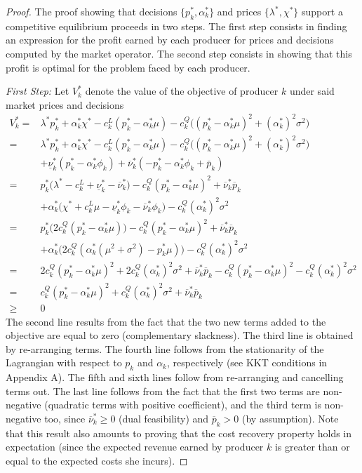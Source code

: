 \documentclass{article}
\begin{document}
\begin{proof}
The proof showing that decisions $\{p_k^*, \alpha_k^*\}$ and prices $\{\lambda^*, \chi^*\}$ support a competitive equilibrium proceeds in two steps. The first step consists in finding an expression for the profit earned by each producer for prices and decisions computed by the market operator. The second step consists in showing that this profit is optimal for the problem faced by each producer.

\textit{First Step:} Let $V_k^*$ denote the value of the objective of producer $k$ under said market prices and decisions
\begin{align*}
    V_k^* =& \lambda^*p_k^* + \alpha_k^*\chi^* - c_k^L(p_k^* - \alpha_k^* \mu) - c_k^Q\big((p_k^* - \alpha_k^* \mu)^2 + (\alpha_k^*)^2\sigma^2\big) \\
    =& \lambda^*p_k^* + \alpha_k^*\chi^* - c_k^L(p_k^* - \alpha_k^* \mu) - c_k^Q\big((p_k^* - \alpha_k^* \mu)^2 + (\alpha_k^*)^2\sigma^2\big)\\
    & + \underline{\nu}_k^* (p_k^* - \alpha_k^* \phi_k) + \overline{\nu}_k^*(-p_k^* - \alpha_k^* \phi_k + \bar{p}_k)\\
    =& p_k^*\big(\lambda^* - c_k^L + \underline{\nu}_k^* - \overline{\nu}_k^*\big) - c_k^Q(p_k^* - \alpha_k^* \mu)^2 + \overline{\nu}_k^* \overline{p}_k\\
    &+ \alpha_k^*\big(\chi^* + c_k^L \mu - \underline{\nu}_k^* \phi_k - \overline{\nu}_k^* \phi_k\big) - c_k^Q (\alpha_k^*)^2 \sigma^2 \\
    =& p_k^*\big(2c_k^Q(p_k^* - \alpha_k^* \mu)\big) - c_k^Q(p_k^* - \alpha_k^* \mu)^2 + \overline{\nu}_k^* \overline{p}_k\\ 
    &+ \alpha_k^*\big(2c_k^Q(\alpha_k^*(\mu^2+\sigma^2) - p_k^* \mu)\big) - c_k^Q (\alpha_k^*)^2 \sigma^2\\
    =& 2c_k^Q(p_k^* - \alpha_k^* \mu)^2 + 2c_k^Q (\alpha_k^*)^2 \sigma^2 + \overline{\nu}_k^* \overline{p}_k - c_k^Q(p_k^* - \alpha_k^* \mu)^2 - c_k^Q (\alpha_k^*)^2 \sigma^2\\
    =& c_k^Q(p_k^* - \alpha_k^* \mu)^2 + c_k^Q (\alpha_k^*)^2 \sigma^2 + \overline{\nu}_k^* \overline{p}_k\\
    \ge& 0
\end{align*}
The second line results from the fact that the two new terms added to the objective are equal to zero (complementary slackness). The third line is obtained by re-arranging terms. The fourth line follows from the stationarity of the Lagrangian with respect to $p_k$ and $\alpha_k$, respectively (see KKT conditions in Appendix A). The fifth and sixth lines follow from re-arranging and cancelling terms out. The last line follows from the fact that the first two terms are non-negative (quadratic terms with positive coefficient), and the third term is non-negative too, since $\overline{\nu}_k^* \ge 0$ (dual feasibility) and $\overline{p}_k > 0$ (by assumption). Note that this result also amounts to proving that the cost recovery property holds in expectation (since the expected revenue earned by producer $k$ is greater than or equal to the expected costs she incurs).


\end{proof}
\end{document}
